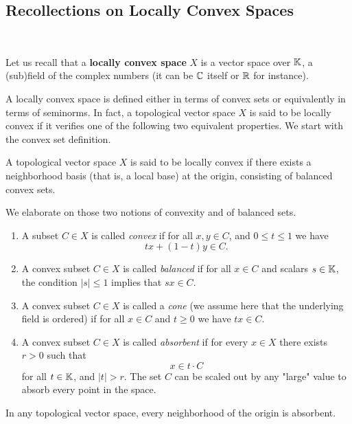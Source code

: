 
\subsection{Recollections on Locally Convex  Spaces}

\, 

Let us recall that a {\bf locally convex  space} $X$ is a vector space over $\mathbb{K}$, a (sub)field of the complex numbers (it can be $\mathbb{C}$ itself or $\mathbb{R}$ for instance).

A locally convex space is defined either in terms of convex sets or equivalently in terms of seminorms.
In fact, a topological vector space $X$ is said to be locally convex if it verifies one of the following two equivalent properties. We start with the convex set definition.

\begin{definition}
A topological vector space $X$ is said to be locally convex if there exists  a neighborhood basis (that is, a local base) at the origin, consisting of balanced convex sets. 

We elaborate on those two notions of convexity and of balanced sets. 

\begin{enumerate}
\item A subset $C\in  X$ is called \emph{convex} if for all $ x,y\in C$, and $0\leq t\leq 1$ we have 
\[tx+(1-t)y\in C.\] 
\item A convex subset $C\in  X$ is called 
\emph{balanced} if for all $x\in C$ and scalars $s\in \mathbb{K}$, the condition $|s|\leq 1$ implies that $ sx\in C$.
\item A convex subset $C\in  X$ is called a \emph{cone} (we assume here that the underlying field is ordered) if for all  $x\in C$ and 
$ t\geq 0$ we have $tx\in C$.
\item A convex subset $C\in  X$ is called  \emph{absorbent}  if for every $ x\in X$ there exists $r>0$ such that 
\[ x\in t\cdot C\] for all $t\in \mathbb{K}$, and  $|t|>r$. The set 
$C$ can be scaled out by any "large" value to absorb every point in the space.
\end{enumerate} 
\end{definition}
In any topological vector space, every neighborhood of the origin is absorbent.

